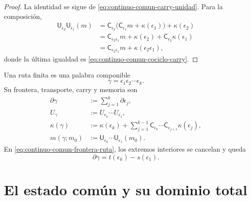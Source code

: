 \begin{proof}
La identidad se sigue de \eqref{eq:continuo-comun-carry-unidad}.  Para la
composición,
\begin{align*}
 \mathsf U_{\epsilon_2}\mathsf U_{\epsilon_1}(m)
 &=\mathsf C_{\epsilon_2}
   \bigl(\mathsf C_{\epsilon_1}m+\kappa(\epsilon_1)\bigr)
   +\kappa(\epsilon_2)\\
 &=\mathsf C_{\epsilon_2\epsilon_1}m
   +\kappa(\epsilon_2)
   +\mathsf C_{\epsilon_2}\kappa(\epsilon_1)\\
 &=\mathsf C_{\epsilon_2\epsilon_1}m
   +\kappa(\epsilon_2\epsilon_1),
\end{align*}
donde la última igualdad es
\eqref{eq:continuo-comun-cociclo-carry}.
\end{proof}

Una ruta finita es una palabra componible
\begin{equation}
\label{eq:continuo-comun-ruta}
 \gamma=\epsilon_1\epsilon_2\cdots\epsilon_k.
\end{equation}
Su frontera, transporte, carry y memoria son
\begin{align}
 \partial\gamma
 &:=\sum_{j=1}^{k}\partial\epsilon_j,
 \label{eq:continuo-comun-frontera-ruta}\\
 U_\gamma
 &:=U_{\epsilon_k}\cdots U_{\epsilon_1},
 \label{eq:continuo-comun-transporte-ruta}\\
 \kappa(\gamma)
 &:=\kappa(\epsilon_k)
   +\sum_{j=1}^{k-1}
    \mathsf C_{\epsilon_k}\cdots\mathsf C_{\epsilon_{j+1}}
    \kappa(\epsilon_j),
 \label{eq:continuo-comun-carry-ruta}\\
 m(\gamma;m_0)
 &:=\mathsf U_{\epsilon_k}\cdots
       \mathsf U_{\epsilon_1}(m_0).
 \label{eq:continuo-comun-memoria-ruta}
\end{align}
En \eqref{eq:continuo-comun-frontera-ruta}, los extremos interiores se
cancelan y queda
\begin{equation}
\label{eq:continuo-comun-frontera-telescopica}
 \partial\gamma=t(\epsilon_k)-s(\epsilon_1).
\end{equation}

\section{El estado común y su dominio total}
\label{sec:continuo-comun-estado-total}

